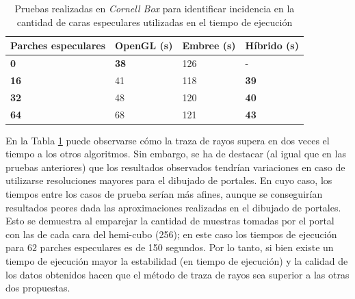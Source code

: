 \begin{table}[htbp!]
	\centering
	\caption{Pruebas realizadas en \textit{Cornell Box} para identificar incidencia en la cantidad de caras especulares utilizadas en el tiempo de ejecución}
\begin{tabular}{|l|l|l|l|}
	\hline
	\multicolumn{1}{|c|}{\textbf{Parches especulares}} & \multicolumn{1}{c|}{OpenGL (s)} & \multicolumn{1}{c|}{Embree (s)} & \multicolumn{1}{c|}{Híbrido (s)} \\ \hline
	\textbf{0}                              & \textbf{38}                          & 126                         & -                            \\ \hline
	\textbf{16}                             & 41                          & 118                         & \textbf{39}                           \\ \hline
	\textbf{32}                             & 48                          & 120                         & \textbf{40}                           \\ \hline
	\textbf{64}                             & 68                          & 121                         & \textbf{43}                           \\ \hline
\end{tabular}
	\label{tab:caso3}
\end{table}

En la Tabla \ref{tab:caso3} puede observarse cómo la traza de rayos supera en dos veces el tiempo a los otros algoritmos. Sin embargo, se ha de destacar (al igual que en las pruebas anteriores) que los resultados observados tendrían variaciones en caso de utilizarse resoluciones mayores para el dibujado de portales. En cuyo caso, los tiempos entre los casos de prueba serían más afines, aunque se conseguirían resultados peores dada las aproximaciones realizadas en el dibujado de portales. Esto se demuestra al emparejar la cantidad de muestras tomadas por el portal con las de cada cara del hemi-cubo (256); en este caso los tiempos de ejecución para $62$ parches especulares es de 150 segundos. Por lo tanto, si bien existe un tiempo de ejecución mayor la estabilidad (en tiempo de ejecución) y la calidad de los datos obtenidos hacen que el método de traza de rayos sea superior a las otras dos propuestas.

